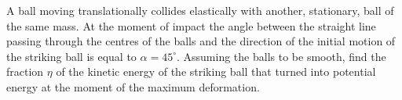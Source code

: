 \item A ball moving translationally collides elastically with another, stationary, ball of the same mass. At the moment of impact the angle between the straight line passing through the centres of the balls and the direction of the initial motion of the striking ball is equal to \(\alpha = 45^\circ\). Assuming the balls to be smooth, find the fraction \(\eta\) of the kinetic energy of the striking ball that turned into potential energy at the moment of the maximum deformation.
\begin{solution}
    \begin{center}
    \end{center}
    
\end{solution}
